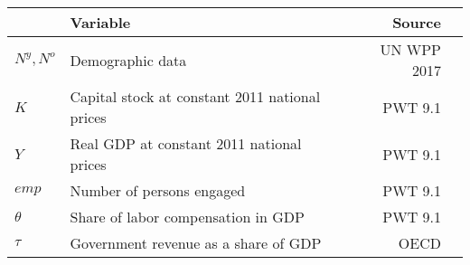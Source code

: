 
\begin{tabular}{llrr}
\toprule
\textbf{} & \textbf{Variable} & \textbf{Source}\\
\midrule
$N^y, N^o$ & Demographic data & UN WPP 2017\\
$K$ & Capital stock at constant 2011 national prices & PWT 9.1 \\
$Y$ & Real GDP at constant 2011 national prices & PWT 9.1 \\
$emp$ & Number of persons engaged & PWT 9.1 \\
$\theta$ & Share of labor compensation in GDP & PWT 9.1 \\
$\tau$ & Government revenue as a share of GDP & OECD \\
\bottomrule
\end{tabular}
